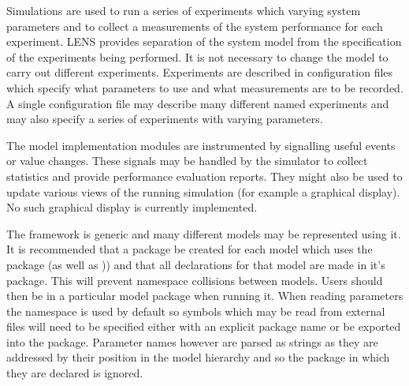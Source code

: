 \documentclass[a4paper,11pt,twoside,openany]{report}
\newcommand{\acr}[1]{\acrshort{#1}}
\begin{document}
Simulations are used to run a series of experiments which
varying system parameters and to collect a measurements
of the system performance for each experiment. \acr{LENS} provides
separation of the system model from the specification of the
experiments being performed. It is not necessary to change the
model to carry out different experiments. Experiments are described in
configuration files which specify what parameters to use and what
measurements are to be recorded. A single configuration file may
describe many different named experiments and may also specify a
series of experiments with varying parameters. 

The model implementation modules are instrumented by
signalling useful events or value changes. These signals
may be handled by the simulator to collect statistics and provide
performance evaluation reports. They might also be used to update
various views of the running simulation (for example a graphical
display).  No such graphical display is currently implemented.

The framework is generic and many different models may be
represented using it. It is recommended that a package be created for
each model which uses the  package (as well as 
)) and that all declarations
for that model are made in it's package. This will prevent namespace
collisions between models. Users should then be in a particular model package
when running it. When reading parameters the   namespace is
used by default so symbols which may be read from external files will
need to be specified either with an explicit package name or be
exported into the  package. Parameter names however are
parsed as strings as they are addressed by their position in the model
hierarchy and so the package in which they are declared is ignored.

\end{document}
